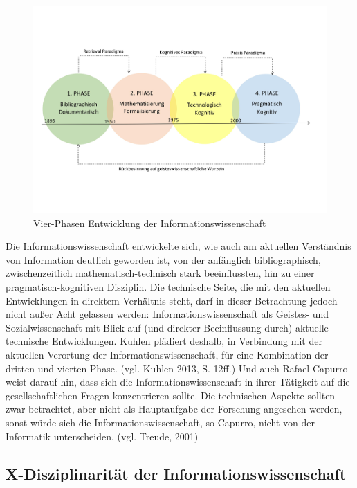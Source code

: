\documentclass[a4paper,
fontsize=11pt,
oneside,
numbers=noperiodatend,
parskip=half-,
bibliography=totoc,
final
]{scrartcl}
\begin{document}
\begin{figure}
\centering
\includegraphics{img/Phasen_IW.jpg}
\caption{Vier-Phasen Entwicklung der Informationswissenschaft}
\end{figure}

Die Informationswissenschaft entwickelte sich, wie auch am aktuellen
Verständnis von Information deutlich geworden ist, von der anfänglich
bibliographisch, zwischenzeitlich mathematisch-technisch stark
beeinflussten, hin zu einer pragmatisch-kognitiven Disziplin. Die
technische Seite, die mit den aktuellen Entwicklungen in direktem
Verhältnis steht, darf in dieser Betrachtung jedoch nicht außer Acht
gelassen werden: Informationswissenschaft als Geistes- und
Sozialwissenschaft mit Blick auf (und direkter Beeinflussung durch)
aktuelle technische Entwicklungen. Kuhlen plädiert deshalb, in
Verbindung mit der aktuellen Verortung der Informationswissenschaft, für
eine Kombination der dritten und vierten Phase. (vgl. Kuhlen 2013, S.
12ff.) Und auch Rafael Capurro weist darauf hin, dass sich die
Informationswissenschaft in ihrer Tätigkeit auf die gesellschaftlichen
Fragen konzentrieren sollte. Die technischen Aspekte sollten zwar
betrachtet, aber nicht als Hauptaufgabe der Forschung angesehen werden,
sonst würde sich die Informationswissenschaft, so Capurro, nicht von der
Informatik unterscheiden. (vgl. Treude, 2001)

\subsection*{X-Disziplinarität der
Informationswissenschaft}\label{x-disziplinarituxe4t-der-informationswissenschaft}
\end{document}
